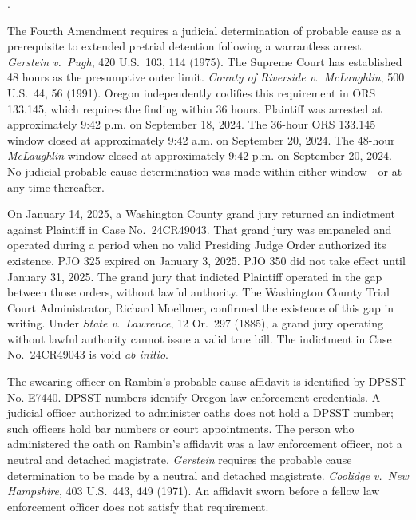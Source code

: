 \documentclass[12pt,letterpaper]{article}
\newcounter{complaintpara}
\newenvironment{paras}{%
	\begin{list}{\arabic{complaintpara}.}{%
			\setlength{\leftmargin}{0.5in}%
			\setlength{\labelwidth}{0.4in}%
			\setlength{\labelsep}{0.1in}%
			\setlength{\itemsep}{0pt}%
			\setlength{\parsep}{0pt}%
			\setlength{\topsep}{6pt}%
		}%
	}{%
	\end{list}%
}
\begin{document}
\begin{paras}
		\item\label{fact:gerstein-violation} The Fourth Amendment requires a judicial determination of probable cause as a prerequisite to extended pretrial detention following a warrantless arrest. \textit{Gerstein v.\ Pugh}, 420 U.S.\ 103, 114 (1975). The Supreme Court has established 48 hours as the presumptive outer limit. \textit{County of Riverside v.\ McLaughlin}, 500 U.S.\ 44, 56 (1991). Oregon independently codifies this requirement in ORS 133.145, which requires the finding within 36 hours. Plaintiff was arrested at approximately 9:42 p.m. on September 18, 2024. The 36-hour ORS 133.145 window closed at approximately 9:42 a.m. on September 20, 2024. The 48-hour \textit{McLaughlin} window closed at approximately 9:42 p.m. on September 20, 2024. No judicial probable cause determination was made within either window---or at any time thereafter.
		
		\item\label{fact:grandjury} On January 14, 2025, a Washington
		County grand jury returned an indictment against Plaintiff in Case No.\ 24CR49043. That grand jury was empaneled and operated
		during a period when no valid Presiding Judge Order authorized
		its existence. PJO 325 expired on January 3, 2025. PJO 350
		did not take effect until January 31, 2025. The grand jury
		that indicted Plaintiff operated in the gap between those
		orders, without lawful authority. The Washington County Trial
		Court Administrator, Richard Moellmer, confirmed the existence
		of this gap in writing. Under \textit{State v.\ Lawrence},
		12 Or.\ 297 (1885), a grand jury operating without lawful
		authority cannot issue a valid true bill. The indictment in
		Case No.\ 24CR49043 is void \textit{ab initio}.
		
		\item\label{fact:gerstein-oath} The swearing officer on Rambin's probable cause affidavit is identified by DPSST No. E7440. DPSST numbers identify Oregon law enforcement credentials. A judicial officer authorized to administer oaths does not hold a DPSST number; such officers hold bar numbers or court appointments. The person who administered the oath on Rambin's affidavit was a law enforcement officer, not a neutral and detached magistrate. \textit{Gerstein} requires the probable cause determination to be made by a neutral and detached magistrate. \textit{Coolidge v.\ New Hampshire}, 403 U.S.\ 443, 449 (1971). An affidavit sworn before a fellow law enforcement officer does not satisfy that requirement.
		

\end{paras}
\end{document}

